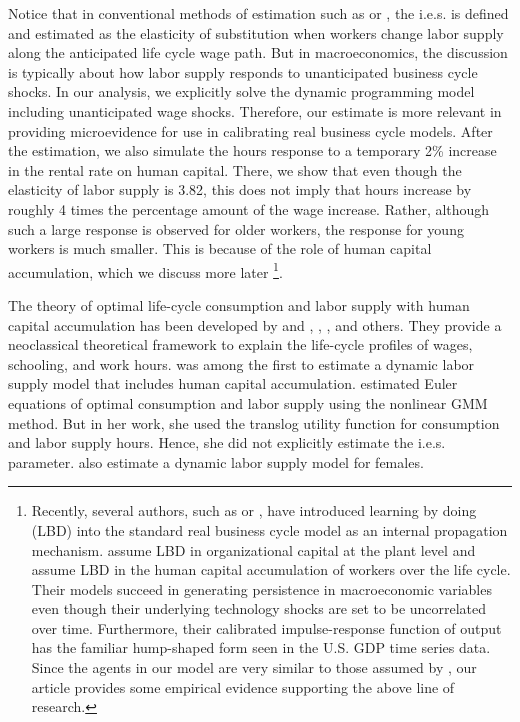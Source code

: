 \documentclass[\econtexRoot/ImaiKeane]{subfiles}
\begin{document}
Notice that in conventional methods of estimation such as \cite{MaCurdy1981-iy} or  \cite{Altonji1986-zf}, the i.e.s. is defined and estimated as the elasticity of substitution when workers change labor supply along the anticipated life cycle wage path. But in macroeconomics, the discussion is typically about how labor supply responds to unanticipated business cycle shocks. In our analysis, we explicitly solve the dynamic programming model including unanticipated wage shocks. Therefore, our estimate is more relevant in providing microevidence for use in calibrating real business cycle models. After the estimation, we also simulate the hours response to a temporary 2\% increase in the rental rate on human capital. There, we show that even though the elasticity of labor supply is 3.82, this does not imply that hours increase by roughly 4 times the percentage amount of the wage increase. Rather, although such a large response is observed for older workers, the response for young workers is much smaller. This is because of the role of human capital accumulation, which we discuss more later \footnote[3]{Recently, several authors, such as \cite{Cooper1999-af} or \cite{Chang2002-zs}, have introduced learning by doing (LBD) into the standard real business cycle model as an internal propagation mechanism. \cite{Cooper1999-af} assume LBD in organizational capital at the plant level and \cite{Chang2002-zs} assume LBD in the human capital accumulation of workers over the life cycle. Their models succeed in generating persistence in macroeconomic variables even though their underlying technology shocks are set to be uncorrelated over time. Furthermore, their calibrated impulse-response function of output has the familiar hump-shaped form seen in the U.S. GDP time series data. Since the agents in our model are very similar to those assumed by \cite{Chang2002-zs}, our article provides some empirical evidence supporting the above line of research.}. \par
The theory of optimal life-cycle consumption and labor supply with human capital accumulation has been developed by \cite{Heckman1976-lb} and \cite{Heckman1976-lc}, \cite{Ben-Porath1967-sf}, \cite{Blinder1976-dv}, and others. They provide a neoclassical theoretical framework to explain the life-cycle profiles of wages, schooling, and work hours. \cite{Shaw1989-jb} was among the first to estimate a dynamic labor supply model that includes human capital accumulation. \cite{Shaw1989-jb} estimated Euler equations of optimal consumption and labor supply using the nonlinear GMM method. But in her work, she used the translog utility function for consumption and labor supply hours. Hence, she did not explicitly estimate the i.e.s. parameter. \cite{Altug1998-ou} also estimate a dynamic labor supply model for females. \par
\end{document}
